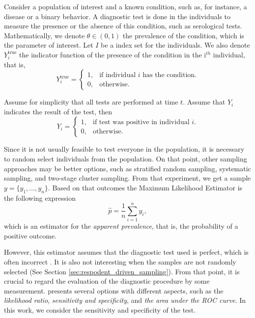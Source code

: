 Consider a population of interest and a known condition, such as, for instance,
a disease or a binary behavior. A diagnostic test is done in the individuals
to measure the presence or the absence of this condition, such as serological
tests. Mathematically, we denote $\theta \in (0,1)$ the prevalence of the
condition, which is the parameter of interest. Let $I$ be a index set for the
individuals. We also denote $Y^{\mathrm{true}}_i$ the indicator function of
the presence of the condition in the i$^{th}$ individual, that is, 
$$Y^{\mathrm{true}}_i = \begin{cases}
  1, &\text{if individual } i \text{ has the condition.} \\
  0, &\text{otherwise.}
\end{cases}$$

Assume for simplicity that all tests are performed at time $t$. Assume that
$Y_i$ indicates the result of the test, then 
$$Y_i = \begin{cases}
  1, &\text{if test was positive in individual } i. \\
  0, &\text{otherwise.}
\end{cases}$$

Since it is not usually feasible to test everyone in the population, it is
necessary to random select individuals from the population. On that point,
other sampling approaches may be better options, such as stratified random
sampling, systematic sampling, and two-stage cluster sampling. From that
experiment, we get a sample $y = \{y_1, ..., y_n\}$. Based on that outcomes the Maximum Likelihood Estimator is the following expression 
\begin{equation}
    \label{eq:naive-estimator}
    \hat{p} = \frac{1}{n}\sum_{i=1}^n y_i, 
\end{equation}
which is an estimator for the {\em apparent prevalence}, that is, the
probability of a positive outcome. 

However, this estimator assumes that the diagnostic test used is perfect,
which is often incorrect . It is also not
interesting when the samples are not randomly selected (See Section
\ref{sec:respodent_driven_sampling}). From that point, it is crucial to regard
the evaluation of the diagnostic procedure by some measurement. \textcite[p.
2]{vsimundic2009measures} presents several options with different aspects,
such as the {\em likelihood ratio}, {\em sensitivity and specificity}, and
{\em the area under the ROC curve}. In this work, we consider the sensitivity
and specificity of the test.

